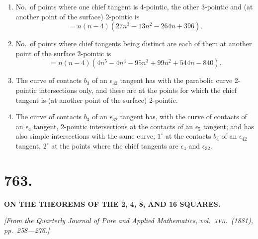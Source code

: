 \documentclass[11pt,a4paper,english]{article}
\theoremstyle{plain}
\begin{document}
\begin{enumerate}[label=\arabic*., start=25]
\item No.\ of points where one chief tangent is 4-pointic, the other 3-pointic and (at another point of the surface) 2-pointic is
\[= n(n-4)(27n^3 - 13n^2 - 264n + 396).\]

\item No.\ of points where chief tangents being distinct are each of them at another point of the surface 2-pointic is
\[= n(n-4)(4n^5 - 4n^4 - 95n^3 + 99n^2 + 544n - 840).\]

\item The curve of contacts $b_3$ of an $\epsilon_{32}$ tangent has with the parabolic curve 2-pointic intersections only, and these are at the points for which the chief tangent is (at another point of the surface) 2-pointic.

\item The curve of contacts $b_3$ of an $\epsilon_{32}$ tangent has, with the curve of contacts of an $\epsilon_4$ tangent, 2-pointic intersections at the contacts of an $\epsilon_5$ tangent; and has also simple intersections with the same curve, $1^{\circ}$ at the contacts $b_4$ of an $\epsilon_{42}$ tangent, $2^{\circ}$ at the points where the chief tangents are $\epsilon_4$ and $\epsilon_{32}$.
\end{enumerate}

\newpage

\section*{763.}

\begin{center}
\textbf{ON THE THEOREMS OF THE 2, 4, 8, AND 16 SQUARES.}
\end{center}

\noindent\textit{[From the \textit{Quarterly Journal of Pure and Applied Mathematics}, vol.\ \textsc{xvii}.\ (1881), pp.\ 258---276.]}

\vspace{\baselineskip}
\end{document}
